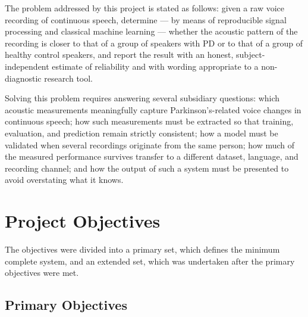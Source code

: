 The problem addressed by this project is stated as follows: given a raw
voice recording of continuous speech, determine --- by means of
reproducible signal processing and classical machine learning ---
whether the acoustic pattern of the recording is closer to that of a
group of speakers with PD or to that of a group of healthy control
speakers, and report the result with an honest, subject-independent
estimate of reliability and with wording appropriate to a
non-diagnostic research tool.

Solving this problem requires answering several subsidiary questions:
which acoustic measurements meaningfully capture Parkinson's-related
voice changes in continuous speech; how such measurements must be
extracted so that training, evaluation, and prediction remain strictly
consistent; how a model must be validated when several recordings
originate from the same person; how much of the measured performance
survives transfer to a different dataset, language, and recording
channel; and how the output of such a system must be presented to avoid
overstating what it knows.

\section{Project Objectives}

The objectives were divided into a primary set, which defines the
minimum complete system, and an extended set, which was undertaken after
the primary objectives were met.

\subsection{Primary Objectives}

